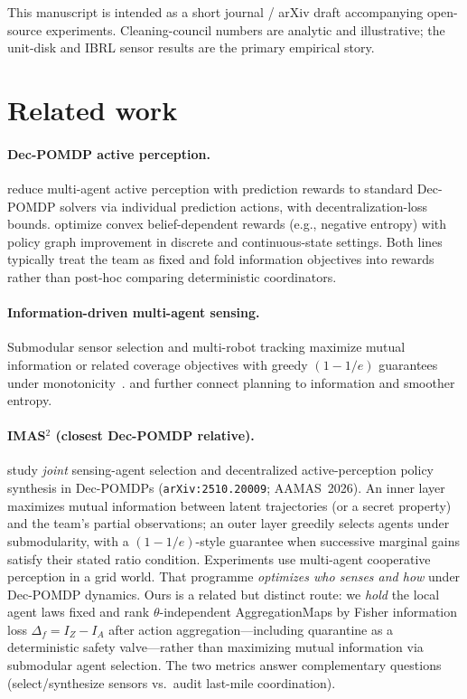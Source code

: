 \documentclass[11pt,a4paper]{article}
\begin{document}
This manuscript is intended as a short journal / arXiv draft accompanying
open-source experiments. Cleaning-council numbers are analytic and
illustrative; the unit-disk and IBRL sensor results are the primary empirical
story.

\section{Related work}
\label{sec:related}

\paragraph{Dec-POMDP active perception.}
\citet{lauri2020prediction} reduce multi-agent active perception with
prediction rewards to standard Dec-POMDP solvers via individual prediction
actions, with decentralization-loss bounds. \citet{lauri2020decpomdp}
optimize convex belief-dependent rewards (e.g., negative entropy) with policy
graph improvement in discrete and continuous-state settings. Both lines
typically treat the team as fixed and fold information objectives into
rewards rather than post-hoc comparing deterministic coordinators.

\paragraph{Information-driven multi-agent sensing.}
Submodular sensor selection and multi-robot tracking maximize mutual
information or related coverage objectives with greedy
$(1-1/e)$ guarantees under monotonicity~\citep{krause2008near,corah2021scalable}.
\citet{olkin2024vulcan} and \citet{molloy2023smoother} further connect planning
to information and smoother entropy.

\paragraph{IMAS$^2$ (closest Dec-POMDP relative).}
\citet{shi2026imas2} study \emph{joint} sensing-agent selection and
decentralized active-perception policy synthesis in Dec-POMDPs
(\texttt{arXiv:2510.20009}; AAMAS~2026). An inner layer maximizes mutual
information between latent trajectories (or a secret property) and the team's
partial observations; an outer layer greedily selects agents under
submodularity, with a $(1-1/e)$-style guarantee when successive marginal gains
satisfy their stated ratio condition. Experiments use multi-agent cooperative
perception in a grid world. That programme \emph{optimizes who senses and how}
under Dec-POMDP dynamics. Ours is a related but distinct route: we
\emph{hold} the local agent laws fixed and rank $\theta$-independent
AggregationMaps by Fisher information loss
$\Delta_f=I_Z-I_A$ after action aggregation---including quarantine as a
deterministic safety valve---rather than maximizing mutual information via
submodular agent selection. The two metrics answer complementary questions
(select/synthesize sensors vs.\ audit last-mile coordination).
\end{document}
